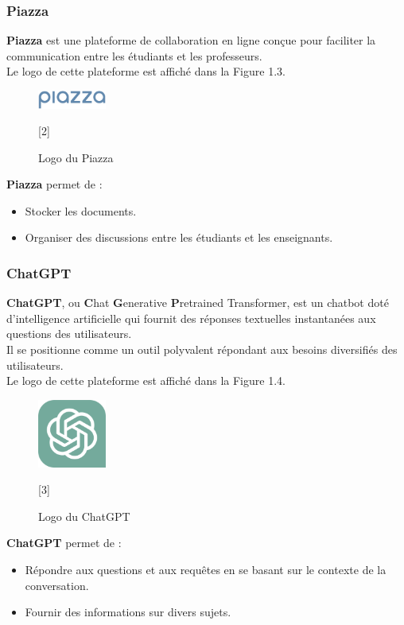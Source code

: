 \subsubsection{Piazza}
    \textbf{Piazza} est une plateforme de collaboration en ligne conçue pour faciliter la communication entre les étudiants et les professeurs.\\
    Le logo de cette plateforme est affiché dans la Figure 1.3.
    \begin{figure}[H]
        \centering
        \includegraphics[width=0.2\textwidth,height=0.15\textwidth]{images/piazza-logo.png}
        \caption{Logo du Piazza}[2]
        \label{fig:piazza-logo}
    \end{figure}
    \noindent \textbf{Piazza} permet de :
        \begin{itemize}[itemsep=1pt, parsep=1pt]
            \item Stocker les documents.
            \item Organiser des discussions entre les étudiants et les enseignants.
        \end{itemize}

\subsubsection{ChatGPT}
\textbf{ChatGPT}, ou \textbf{C}hat \textbf{G}enerative \textbf{P}retrained Transformer, est un chatbot doté d'intelligence artificielle qui fournit des réponses textuelles instantanées aux questions des utilisateurs.\\
Il se positionne comme un outil polyvalent répondant aux besoins diversifiés des utilisateurs.\\
Le logo de cette plateforme est affiché dans la Figure 1.4.
\begin{figure}[H]
    \centering
    \includegraphics[width=0.2\textwidth]{images/chatgpt-logo.png}
    \caption{Logo du ChatGPT}[3]
    \label{fig:chatgpt-logo}
\end{figure}
\noindent \textbf{ChatGPT} permet de :
    \begin{itemize}[itemsep=1pt, parsep=1pt]
        \item Répondre aux questions et aux requêtes en se basant sur le contexte de la conversation.
        \item Fournir des informations sur divers sujets.
    \end{itemize}

